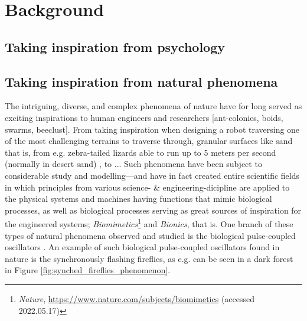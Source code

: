 \chapter{Background}
\label{chap:background}




	 \nl



\section{Taking inspiration from psychology}




	 \nl






\section{Taking inspiration from natural phenomena}
The intriguing, diverse, and complex phenomena of nature have for long served as exciting inspirations to human engineers and researchers [ant-colonies, boids, swarms, beeclust]. From taking inspiration when designing a robot traversing one of the most challenging terrains to traverse through, granular surfaces like sand that is, from e.g. zebra-tailed lizards able to run up to 5 meters per second (normally in desert sand) \cite{sandbots}, to ... Such phenomena have been subject to considerable study and modelling—and have in fact created entire scientific fields in which principles from various science- \& engineering-dicipline are applied to the physical systems and machines having functions that mimic biological processes, as well as biological processes serving as great sources of inspiration for the engineered systems; \textit{Biomimetics}\footnote{\textit{Nature}, \url{https://www.nature.com/subjects/biomimetics} (accessed 2022.05.17)} and \textit{Bionics}, that is. One branch of these types of natural phenomena observed and studied is the biological pulse-coupled oscillators \cite{russerMinimalAssumptionsReferanser}. An example of such biological pulse-coupled oscillators found in nature is the synchronously flashing fireflies, as e.g. can be seen in a dark forest in Figure \ref{fig:synched_fireflies_phenomenon}.

